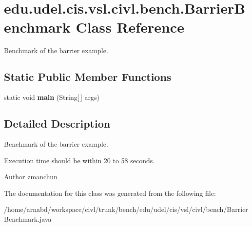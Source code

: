 \hypertarget{classedu_1_1udel_1_1cis_1_1vsl_1_1civl_1_1bench_1_1BarrierBenchmark}{}\section{edu.\+udel.\+cis.\+vsl.\+civl.\+bench.\+Barrier\+Benchmark Class Reference}
\label{classedu_1_1udel_1_1cis_1_1vsl_1_1civl_1_1bench_1_1BarrierBenchmark}


Benchmark of the barrier example.  


\subsection*{Static Public Member Functions}
\begin{DoxyCompactItemize}
\item 
\hypertarget{classedu_1_1udel_1_1cis_1_1vsl_1_1civl_1_1bench_1_1BarrierBenchmark_a0a1f26886b4e91089e92ad297a973de1}{}static void {\bfseries main} (String\mbox{[}$\,$\mbox{]} args)\label{classedu_1_1udel_1_1cis_1_1vsl_1_1civl_1_1bench_1_1BarrierBenchmark_a0a1f26886b4e91089e92ad297a973de1}

\end{DoxyCompactItemize}


\subsection{Detailed Description}
Benchmark of the barrier example. 

Execution time should be within 20 to 58 seconds.

\begin{DoxyAuthor}{Author}
zmanchun 
\end{DoxyAuthor}


The documentation for this class was generated from the following file\+:\begin{DoxyCompactItemize}
\item 
/home/arnabd/workspace/civl/trunk/bench/edu/udel/cis/vsl/civl/bench/Barrier\+Benchmark.\+java\end{DoxyCompactItemize}
